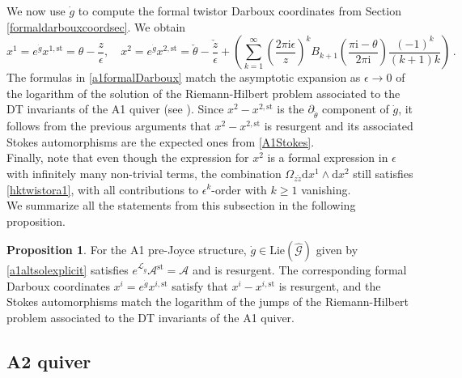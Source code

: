 \documentclass{article}
\theoremstyle{definition}
\newtheorem{proposition}[theorem]{Proposition}
\numberwithin{equation}{section}
\begin{document}
We now use $\dot{g}$ to compute the formal twistor Darboux coordinates from Section \ref{formaldarbouxcoordsec}. We obtain 
\begin{equation}\label{a1formalDarboux}
    x^1=e^{\dot{g}}x^{1,\text{st}}=\theta-\frac{z}{\epsilon}, \quad x^2=e^{\dot{g}}x^{2,\text{st}}=\check{\theta}-\frac{\check{z}}{\epsilon}+\left(\sum_{k=1}^{\infty}\left(\frac{2\pi \mathrm{i}\epsilon}{z}\right)^kB_{k+1}\left(\frac{\pi \mathrm{i}-\theta}{2\pi \mathrm{i}}\right)\frac{(-1)^{k}}{(k+1)k}\right)\,.
\end{equation}
The formulas in \eqref{a1formalDarboux} match the asymptotic expansion as $\epsilon\to 0$ of the logarithm of the solution of the Riemann-Hilbert problem associated to the DT invariants of the A1 quiver (see \cite[Section 8.2]{BridgeJoyce}). Since $x^2-x^{2,\text{st}}$ is the $\partial_{\check{\theta}}$ component of $\dot{g}$, it follows from the previous arguments that $x^2-x^{2,\text{st}}$ is resurgent  and its associated Stokes automorphisms are the expected ones from \eqref{A1Stokes}. \\

Finally, note that even though the expression for $x^2$ is a formal expression in $\epsilon$ with infinitely many non-trivial terms, the combination $\Omega_{z\check{z}}\mathrm{d}x^1\wedge \mathrm{d}x^2$ still satisfies \eqref{hktwistora1}, with all contributions to $\epsilon^k$-order with $k\geq 1$ vanishing.\\

We summarize all the statements from this subsection in the following proposition.

\begin{proposition} For the A1 pre-Joyce structure, $\dot{g}\in \text{Lie}(\widehat{\mathcal{G}})$ given by \eqref{a1altsolexplicit} satisfies $e^{\mathcal{L}_{\dot{g}}}\mathcal{A}^{\text{st}}=\mathcal{A}$ and is resurgent. The corresponding formal Darboux coordinates $x^i=e^{\dot{g}}x^{i,\text{st}}$
satisfy that $x^i-x^{i,\text{st}}$ is resurgent, and the Stokes automorphisms match the logarithm of the jumps of the Riemann-Hilbert problem associated to the DT invariants of the A1  quiver. 
    
\end{proposition}



\subsection{A2 quiver}
\end{document}
